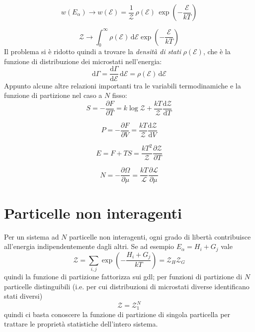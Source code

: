 \documentclass[a4paper]{report}
\begin{document}
\begin{equation}
    w(E_\alpha) \rightarrow w(\mathcal{E}) = \frac{1}{\mathcal{Z}} \, \rho(\mathcal{E})\,\exp \left(-\frac{\mathcal{E}}{k T}\right)
    \label{pesi1}
\end{equation}

\begin{equation}
    \mathcal{Z} \rightarrow \int_0^\infty \rho(\mathcal{E}) \,\mathrm{d}\mathcal{E}  \exp \left(-\frac{\mathcal{E}}{k T}\right)
\end{equation}
Il problema si è ridotto quindi a trovare la \textit{densità di stati} $\rho(\mathcal{E})$, che è la funzione di distribuzione dei microstati nell'energia:
\begin{equation}
    \mathrm{d}\Gamma = \frac{\mathrm{d}\Gamma}{\mathrm{d}\mathcal{E}} \,\mathrm{d}\mathcal{E} = \rho(\mathcal{E}) \,\mathrm{d}\mathcal{E}
\end{equation}
Appunto alcune altre relazioni importanti tra le variabili termodinamiche e la funzione di partizione nel caso a $N$ fisso:
\begin{equation}
    S = -\frac{\partial F}{\partial T} = k\log \mathcal{Z} + \frac{k T}{\mathcal{Z}}\frac{\mathrm{d}\mathcal{Z}}{\mathrm{d}T}
\end{equation}

\begin{equation}
    P = -\frac{\partial F}{\partial V} = \frac{k T}{\mathcal{Z}}\frac{\mathrm{d}\mathcal{Z}}{\mathrm{d}V}
\end{equation}

\begin{equation}
    E = F + TS = \frac{k T^2}{\mathcal{Z}}\frac{\partial \mathcal{Z}}{\partial T}
\end{equation}

\begin{equation}
    N = - \frac{\partial \Omega}{\partial \mu} = \frac{k T}{\mathcal{L}} \frac{\partial \mathcal{L}}{\partial \mu}
\end{equation}

\section{Particelle non interagenti}

Per un sistema ad $N$ particelle non interagenti, ogni grado di libertà contribuisce all'energia indipendentemente dagli altri. Se ad esempio $E_\alpha = H_i + G_j$ vale
\begin{equation}
    \mathcal{Z} = \sum_{i,j} \exp \left(-\frac{H_i + G_j}{k T}\right) = \mathcal{Z}_H \mathcal{Z}_G
\end{equation}
quindi la funzione di partizione fattorizza sui gdl; per funzioni di partizione di $N$ particelle distinguibili (i.e. per cui distribuzioni di microstati diverse identificano stati diversi)
\begin{equation}
    \mathcal{Z} = \mathcal{Z}_1^N
\end{equation}
quindi ci basta conoscere la funzione di partizione di singola particella per trattare le proprietà statistiche dell'intero sistema.
\end{document}
